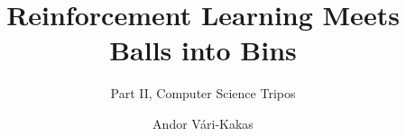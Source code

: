 \title{Reinforcement Learning Meets Balls into Bins}




\subtitle{Part II, Computer Science Tripos}
\author{Andor Vári-Kakas}
\renewcommand{\crest}{}
\renewcommand{\submissiontext}{}


